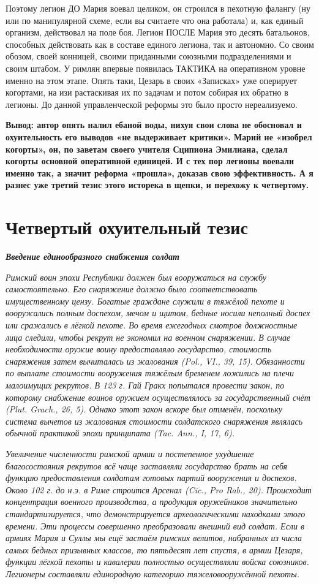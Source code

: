 Поэтому легион ДО Мария воевал целиком, он строился в пехотную фалангу (ну или по манипулярной схеме, если вы считаете что она работала) и, как единый организм, действовал на поле боя. Легион ПОСЛЕ Мария это десять батальонов, способных действовать как в составе единого легиона, так и автономно. Со своим обозом, своей конницей, своими приданными союзными подразделениями и своим штабом. У римлян впервые появилась ТАКТИКА на оперативном уровне именно на этом этапе. Опять таки, Цезарь в своих «Записках» уже оперирует когортами, на изи растаскивая их по задачам и потом собирая их обратно в легионы. До данной управленческой реформы это было просто нереализуемо.


\textbf{Вывод: автор опять налил ебаной воды, нихуя свои слова не обосновал и охуительность его выводов «не выдерживает критики». Марий не «изобрел когорты», он, по заветам своего учителя Сципиона Эмилиана, сделал когорты основной оперативной единицей. И с тех пор легионы воевали именно так, а значит реформа «прошла», доказав свою эффективность. А я разнес уже третий тезис этого исторека в щепки, и перехожу к четвертому.}

\section{Четвертый охуительный тезис}

\textit{\textbf{Введение единообразного снабжения солдат}}

\textit{Римский воин эпохи Республики должен был вооружаться на службу самостоятельно. Его снаряжение должно было соответствовать имущественному цензу. Богатые граждане служили в тяжёлой пехоте и вооружались полным доспехом, мечом и щитом, бедные носили неполный доспех или сражались в лёгкой пехоте. Во время ежегодных смотров должностные лица следили, чтобы рекрут не экономил на военном снаряжении. В случае необходимости оружие воину предоставляло государство, стоимость снаряжения затем вычиталась из жалования (Pol., VI., 39, 15). Обязанности по выплате стоимости вооружения тяжёлым бременем ложились на плечи малоимущих рекрутов. В 123 г. Гай Гракх попытался провести закон, по которому снабжение воинов оружием осуществлялось за государственный счёт (Plut. Grach., 26, 5). Однако этот закон вскоре был отменён, поскольку система вычетов из жалования стоимости солдатского снаряжения являлась обычной практикой эпохи принципата (Tac. Ann., I, 17, 6).}


\textit{Увеличение численности римской армии и постепенное ухудшение благосостояния рекрутов всё чаще заставляли государство брать на себя функцию предоставления солдатам готовых партий вооружения и доспехов. Около 102 г. до н.э. в Риме строится Арсенал (Cic., Pro Rab., 20). Происходит концентрация военного производства, а продукция оружейников значительно стандартизируется, что демонстрируется археологическими находками этого времени. Эти процессы совершенно преобразовали внешний вид солдат. Если в армиях Мария и Суллы мы ещё застаём римских велитов, набранных из числа самых бедных призывных классов, то пятьдесят лет спустя, в армии Цезаря, функции лёгкой пехоты и кавалерии полностью осуществляли войска союзников. Легионеры составляли единородную категорию тяжеловооружённой пехоты.}

